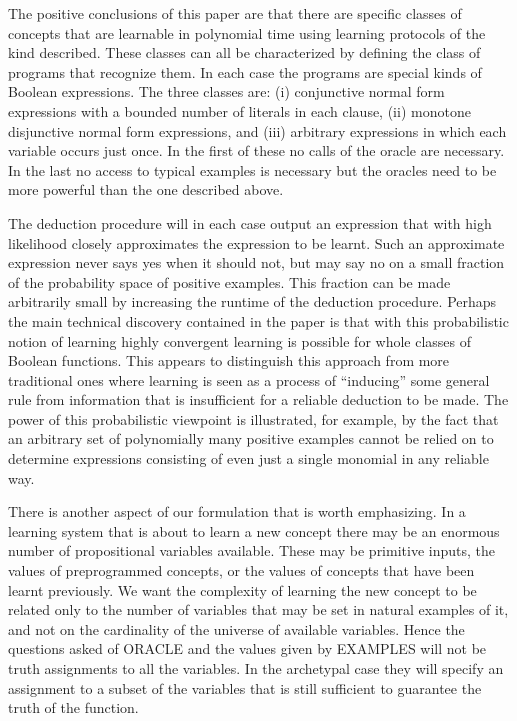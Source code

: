 The positive conclusions of this paper are
that there are specific classes of concepts that
are learnable in polynomial time using learning
protocols of the kind described.  These classes
can all be characterized by defining the class
of programs that recognize them.  In each case
the programs are special kinds of Boolean expressions.  The three classes are:  (i) conjunctive normal form expressions with a bounded
number of literals in each clause, (ii) monotone
disjunctive normal form expressions, and (iii)
arbitrary expressions in which each variable
occurs just once.  In the first of these no calls
of the oracle are necessary.  In the last no
access to typical examples is necessary but the
oracles need to be more powerful than the one
described above.

The deduction procedure will in each case output an expression that with high likelihood closely
approximates the expression to be learnt.  Such an
approximate expression never says yes when it
should not, but may say no on a small fraction of
the probability space of positive examples.  This
fraction can be made arbitrarily small by increasing the runtime of the deduction procedure.  Perhaps the main technical discovery contained in the
paper is that with this probabilistic notion of
learning highly convergent learning is possible for
whole classes of Boolean functions.  This appears
to distinguish this approach from more traditional
ones where learning is seen as a process of ``inducing'' some general rule from information that is
insufficient for a reliable deduction to be made.
The power of this probabilistic viewpoint is
illustrated, for example, by the fact that an
arbitrary set of polynomially many positive examples cannot be relied on to determine expressions
consisting of even just a single monomial in any
reliable way.

There is another aspect of our formulation that
is worth emphasizing.  In a learning system that is
about to learn a new concept there may be an
enormous number of propositional variables available.  These may be primitive inputs, the values of
preprogrammed concepts, or the values of concepts
that have been learnt previously.  We want the
complexity of learning the new concept to be related only to the number of variables that may be set
in natural examples of it, and not on the cardinality of the universe of available variables.
Hence the questions asked of ORACLE and the values
given by EXAMPLES will not be truth assignments to
all the variables.  In the archetypal case they
will specify an assignment to a subset of the
variables that is still sufficient to guarantee
the truth of the function.

